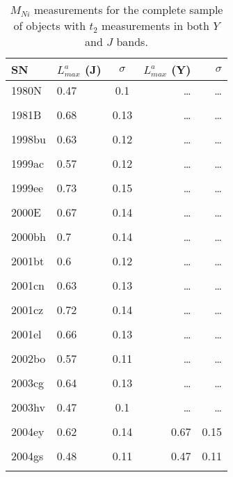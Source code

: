 \begin{table}
\begin{minipage}{70mm}
\begin{center}
\caption{$M_{Ni}$ measurements for the complete sample of objects with $t_2$ measurements in both $Y$ and $J$ bands.}
\begin{tabular}{llcrr}
\hline
SN & $L_{max}^{a}$ (J)	& $\sigma$ & $L_{max}^{a}$ (Y) & $\sigma$ \\
\hline
1980N & 0.47 & 0.1 & \ldots & \ldots \\ \\
1981B & 0.68 & 0.13 & \ldots & \ldots\\ \\
1998bu & 0.63 & 0.12 & \ldots & \ldots\\ \\
1999ac & 0.57 & 0.12 & \ldots & \ldots\\ \\
1999ee & 0.73 & 0.15 & \ldots & \ldots \\ \\
2000E & 0.67 & 0.14 & \ldots & \ldots\\ \\
2000bh & 0.7 & 0.14 & \ldots & \ldots\\ \\
2001bt & 0.6 & 0.12 & \ldots & \ldots\\ \\
2001cn & 0.63 & 0.13 & \ldots & \ldots\\ \\
2001cz & 0.72 & 0.14 & \ldots & \ldots\\ \\
2001el & 0.66 & 0.13 & \ldots & \ldots\\ \\
2002bo & 0.57 & 0.11 & \ldots & \ldots\\ \\
2003cg & 0.64 & 0.13 & \ldots & \ldots\\ \\
2003hv & 0.47 & 0.1 & \ldots & \ldots \\ \\
2004ey & 0.62 & 0.14 & 0.67 & 0.15	\\ \\
2004gs & 0.48 & 0.11 & 0.47 & 0.11	\\ \\

\end{tabular}
\end{center}
\end{minipage}
\end{table}
